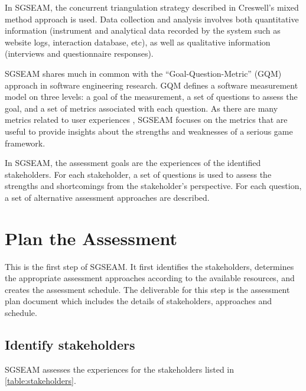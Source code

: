 In SGSEAM, the concurrent triangulation strategy described in Creswell's mixed method approach
is used.  Data collection and analysis involves both quantitative information (instrument and
analytical data recorded by the system such as website logs, interaction database, etc), as well
as qualitative information (interviews and questionnaire responses).

SGSEAM shares much in common with the  ``Goal-Question-Metric'' (GQM) approach \cite{caldiera1994goal} in
software engineering research. GQM defines a software  measurement model on three levels: a goal
of the measurement, a set of questions to assess the goal, and a set of metrics associated with
each question. As there are many metrics related to user experiences \cite{tullis2010measuring}, SGSEAM
focuses on the metrics that are useful to provide insights about the strengths and weaknesses of a serious
game framework.

In SGSEAM, the assessment goals are the experiences of the identified stakeholders. For each
stakeholder, a set of questions is used to assess the strengths and shortcomings from the
stakeholder's perspective. For each question, a set of alternative assessment approaches are
described.

\section{Plan the Assessment}

This is the first step of SGSEAM. It first identifies the stakeholders, determines the appropriate assessment approaches according to the available resources, and creates the assessment schedule. The deliverable for this step is the assessment plan document which includes the details of stakeholders, approaches and schedule.

\subsection{Identify stakeholders}

SGSEAM assesses the experiences for the stakeholders listed in \autoref{table:stakeholders}. 

